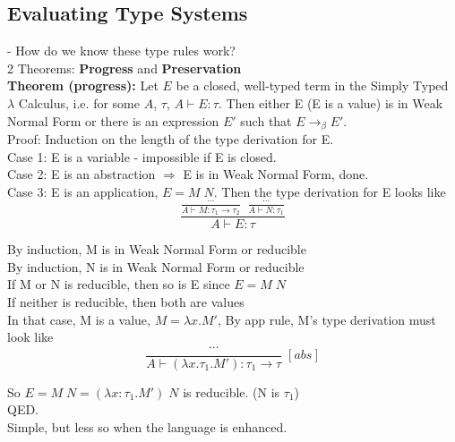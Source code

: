 \documentclass[11pt]{article}
\begin{document}
\subsection{Evaluating Type Systems}

- How do we know these type rules work? \\

2 Theorems: {\bf Progress} and {\bf Preservation} \\

\textbf{Theorem (progress):} Let $E$ be a closed, well-typed term in the Simply Typed $\lambda$ Calculus, i.e. for some $A$, $\tau$, $A \vdash E:\tau$. Then either E (E is a value) is in Weak Normal Form or there is an expression $E'$ such that $E \rightarrow_\beta E'$. \\

Proof: Induction on the length of the type derivation for E. \\

Case 1: E is a variable - impossible if E is closed. \\

Case 2: E is an abstraction $\Rightarrow$ E is in Weak Normal Form, done. \\

Case 3: E is an application, $E = M\;N$. Then the type derivation for E looks like $$\frac{\frac{\cdots}{A \vdash M: \tau_1 \rightarrow \tau_2} \; \; \frac{\cdots}{A \vdash N:\tau_1}}{A \vdash E:\tau}$$
 
By induction, M is in Weak Normal Form or reducible \\

By induction, N is in Weak Normal Form or reducible \\

If M or N is reducible, then so is E since $E = M\;N$ \\

If neither is reducible, then both are values \\

In that case, M is a value, $M = \lambda x.M'$, By app rule, M's type derivation must look like
$$\frac{\cdots}{A \vdash (\lambda x.\tau_1. M'): \tau_1 \rightarrow \tau}\;[abs]$$

So $E = M\;N = (\lambda x:\tau_1.M')\;N$ is reducible. (N is $\tau_1$)\\

QED. \\

Simple, but less so when the language is enhanced. \\
\end{document}
